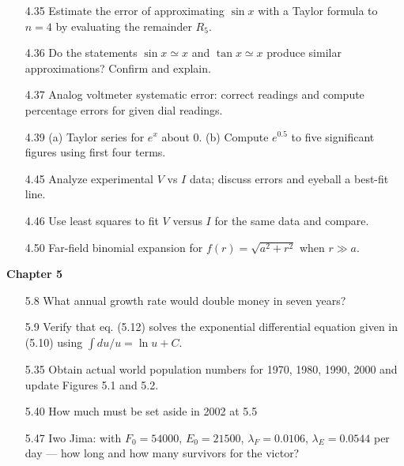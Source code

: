 \begin{enumerate}
  \item[4.35] Estimate the error of approximating $\sin x$ with a Taylor formula to $n=4$ by evaluating the remainder $R_5$.
  \item[4.36] Do the statements $\sin x\simeq x$ and $\tan x\simeq x$ produce similar approximations? Confirm and explain.
  \item[4.37] Analog voltmeter systematic error: correct readings and compute percentage errors for given dial readings.
  \item[4.39] (a) Taylor series for $e^x$ about 0. (b) Compute $e^{0.5}$ to five significant figures using first four terms.
  \item[4.45] Analyze experimental $V$ vs $I$ data; discuss errors and eyeball a best-fit line.
  \item[4.46] Use least squares to fit $V$ versus $I$ for the same data and compare.
  \item[4.50] Far-field binomial expansion for $f(r)=\sqrt{a^2+r^2}$ when $r\gg a$.
\end{enumerate}

\textbf{Chapter 5}
\begin{enumerate}
  \item[5.8] What annual growth rate would double money in seven years?
  \item[5.9] Verify that eq. (5.12) solves the exponential differential equation given in (5.10) using $\int du/u = \ln u + C$.
  \item[5.35] Obtain actual world population numbers for 1970, 1980, 1990, 2000 and update Figures 5.1 and 5.2.
  \item[5.40] How much must be set aside in 2002 at 5.5%
  \item[5.47] Iwo Jima: with $F_0=54000$, $E_0=21500$, $\lambda_F=0.0106$, $\lambda_E=0.0544$ per day — how long and how many survivors for the victor?
\end{enumerate}
